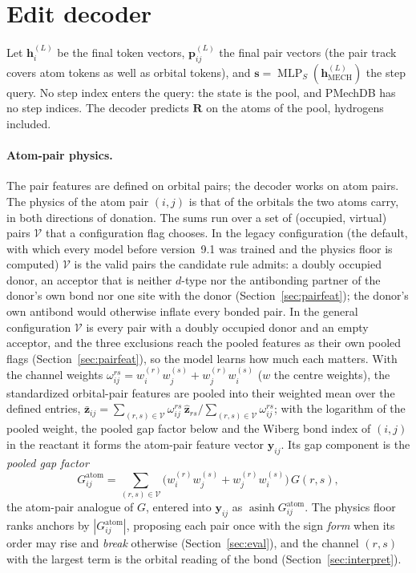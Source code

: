 \documentclass[11pt,a4paper]{article}
\newcommand{\vb}[1]{\bm{#1}}
\newcommand{\MLP}{\operatorname{MLP}}
\begin{document}
\section{Edit decoder}
\label{sec:decoder}
Let $\vb{h}_i^{(L)}$ be the final token vectors, $\vb{p}^{(L)}_{ij}$ the final pair vectors (the pair track covers atom tokens as well as orbital tokens), and $\vb{s}=\MLP_S(\vb{h}^{(L)}_{\mathrm{MECH}})$ the step query. No step index enters the query: the state is the pool, and PMechDB has no step indices. The decoder predicts $\vb{R}$ on the atoms of the pool, hydrogens included.

\paragraph{Atom-pair physics.} The pair features are defined on orbital pairs; the decoder works on atom pairs. The physics of the atom pair $(i,j)$ is that of the orbitals the two atoms carry, in both directions of donation. The sums run over a set of (occupied, virtual) pairs $\mathcal{V}$ that a configuration flag chooses. In the legacy configuration (the default, with which every model before version~9.1 was trained and the physics floor is computed) $\mathcal{V}$ is the valid pairs the candidate rule admits: a doubly occupied donor, an acceptor that is neither $d$-type nor the antibonding partner of the donor's own bond nor one site with the donor (Section~\ref{sec:pairfeat}); the donor's own antibond would otherwise inflate every bonded pair. In the general configuration $\mathcal{V}$ is every pair with a doubly occupied donor and an empty acceptor, and the three exclusions reach the pooled features as their own pooled flags (Section~\ref{sec:pairfeat}), so the model learns how much each matters. With the channel weights $\omega^{rs}_{ij}=w^{(r)}_i w^{(s)}_j+w^{(r)}_j w^{(s)}_i$ ($w$ the centre weights), the standardized orbital-pair features are pooled into their weighted mean over the defined entries, $\bar{\vb z}_{ij}=\sum_{(r,s)\in\mathcal{V}}\omega^{rs}_{ij}\,\hat{\vb z}_{rs}\big/\sum_{(r,s)\in\mathcal{V}}\omega^{rs}_{ij}$; with the logarithm of the pooled weight, the pooled gap factor below and the Wiberg bond index of $(i,j)$ in the reactant it forms the atom-pair feature vector $\vb{y}_{ij}$. Its gap component is the \emph{pooled gap factor}
\begin{equation}
G^{\mathrm{atom}}_{ij}=\sum_{(r,s)\in\mathcal{V}}\big(w^{(r)}_i w^{(s)}_j+w^{(r)}_j w^{(s)}_i\big)\,G(r,s),
\label{eq:Gatom}
\end{equation}
the atom-pair analogue of $G$, entered into $\vb{y}_{ij}$ as $\operatorname{asinh}G^{\mathrm{atom}}_{ij}$. The physics floor ranks anchors by $|G^{\mathrm{atom}}_{ij}|$, proposing each pair once with the sign \emph{form} when its order may rise and \emph{break} otherwise (Section~\ref{sec:eval}), and the channel $(r,s)$ with the largest term is the orbital reading of the bond (Section~\ref{sec:interpret}).
\end{document}
